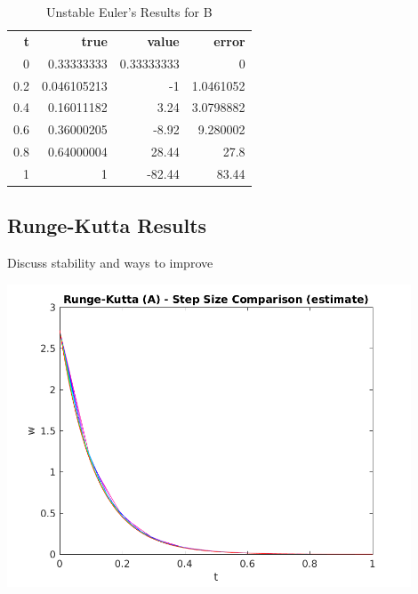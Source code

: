 \documentclass{article}
\begin{document}
\begin{table}
\footnotesize
\centering
\caption{Unstable Euler's Results for B}
\label{tab:un_b_euler}
\begin{tabular}{rrrr}
\textbf{t} & \textbf{true} & \textbf{value} & \textbf{error} \\
0          & 0.33333333    & 0.33333333     & 0              \\
0.2        & 0.046105213   & -1             & 1.0461052      \\
0.4        & 0.16011182    & 3.24           & 3.0798882      \\
0.6        & 0.36000205    & -8.92          & 9.280002       \\
0.8        & 0.64000004    & 28.44          & 27.8           \\
1          & 1             & -82.44         & 83.44         
\end{tabular}
\end{table}



\subsection{Runge-Kutta Results}
\label{results:rk}

Discuss stability and ways to improve

\begin{center}
  \includegraphics[width=0.9\textwidth]{../output/a_rk_h_val.png}
  \label{fig:a_rk_h_val}
\end{center}
\end{document}
